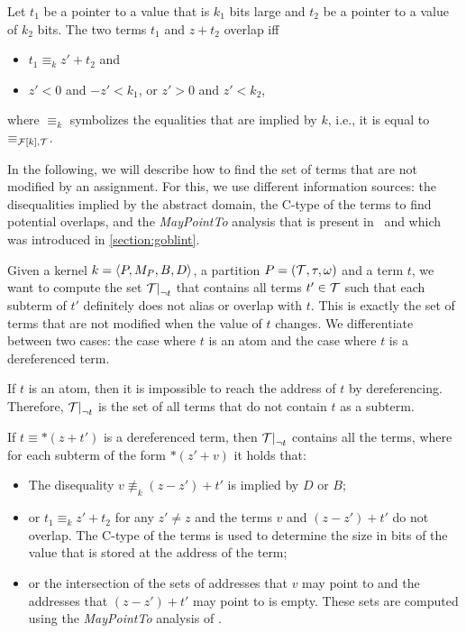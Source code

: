 Let $t_1$ be a pointer to a value that is $k_1$ bits large and $t_2$ be a pointer to a value of $k_2$ bits.
The two terms $t_1$ and $z + t_2$ overlap iff
\begin{itemize}
	\item $t_1 \equiv_{k} z' + t_2$ and
	\item $z' < 0$ and $-z' < k_1$, or $z' > 0$ and $z' < k_2$,
\end{itemize}
where $\equiv_{k}$ symbolizes the equalities that are implied by $k$, i.e.,
it is equal to $\equiv_{\mathcal{F}[k],\mathcal{T}}$.

In the following, we will describe how to find the set of terms
that are not modified by an assignment.
For this, we use different information sources: the disequalities implied by the abstract domain, the C-type of the terms to find potential overlaps, and the \emph{MayPointTo} analysis that is present in \goblint\ and which was introduced in \cref{section:goblint}.

Given a kernel $k = \langle P, M_P, B, D\rangle$, a partition $P = (\mathcal{T}, \tau, \omega)$ and a term $t$,
we want to compute the set $\restr{\T}{\neg t}$ that contains all terms $t' \in \mathcal{T}$ such that each subterm of $t'$ definitely does not alias or overlap with $t$.
This is exactly the set of terms that are not modified when the value of $t$ changes.
We differentiate between two cases: the case where $t$ is an atom and the case where $t$ is a dereferenced term.

If $t$ is an atom, then it is impossible to reach the address of $t$ by dereferencing.
Therefore, $\restr{\T}{\neg t}$ is the set of all terms that do not contain $t$ as a subterm.

If $t \equiv *(z + t')$ is a dereferenced term, then $\restr{\T}{\neg t}$ contains all the terms, where for each subterm of the form $*(z' + v)$ it holds that:
\begin{itemize}
	\item\label{item:diseqs} The disequality $v \nequiv_k (z - z') + t'$ is implied by $D$ or $B$;
    \item\label{item:eqs} or $t_1 \equiv_k z' + t_2$ for any $z' \neq z$ and the terms $v$ and $(z - z') + t'$ do not overlap. The C-type of the terms is used to determine the size in bits of the value that is stored at the address of the term;
    \item or the intersection of the sets of addresses that $v$ may point to and the addresses that $(z - z') + t'$ may point to is empty.
    These sets are computed using the \emph{MayPointTo} analysis of \goblint.
\end{itemize}

